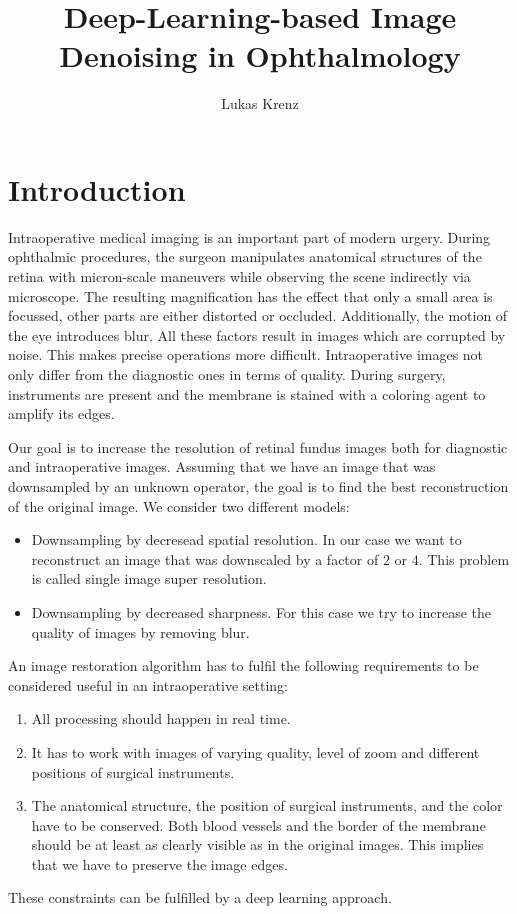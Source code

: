 \documentclass{scrartcl}
\begin{document}
\title{Deep-Learning-based Image Denoising in Ophthalmology}
\author{Lukas Krenz}

\maketitle

\section{Introduction}
Intraoperative medical imaging is an important part of modern urgery.
During ophthalmic procedures, the surgeon manipulates anatomical structures of the retina with micron-scale maneuvers while observing the scene indirectly via microscope.
The resulting magnification has the effect that only a small area is focussed, other parts are either distorted or occluded.
Additionally, the motion of the eye introduces blur.
All these factors result in images which are corrupted by noise.
This makes precise operations more difficult.
Intraoperative images not only differ from the diagnostic ones in terms of quality.
During surgery, instruments are present and the membrane is stained with a coloring agent to amplify its edges.

Our goal is to increase the resolution of retinal fundus images both for diagnostic and intraoperative images.
Assuming that we have an image that was downsampled by an unknown operator, the goal is to find the best reconstruction of the original image.
We consider two different models:
\begin{itemize}
\item Downsampling by decresead spatial resolution.
  In our case we want to reconstruct an image that was downscaled by a factor of $2$ or $4$.
  This problem is called single image super resolution.
\item Downsampling by decreased sharpness.
  For this case we try to increase the quality of images by removing blur.
\end{itemize}

An image restoration algorithm has to fulfil the following requirements to be considered useful in an intraoperative setting:
\begin{enumerate}
\item All processing should happen in real time.
\item It has to work with images of varying quality, level of zoom and different positions of surgical instruments.
\item The anatomical structure, the position of surgical instruments, and the color have to be conserved.
Both blood vessels and the border of the membrane should be at least as clearly visible as in the original images.
This implies that we have to preserve the image edges.
\end{enumerate}
These constraints can be fulfilled by a deep learning approach.
\end{document}
